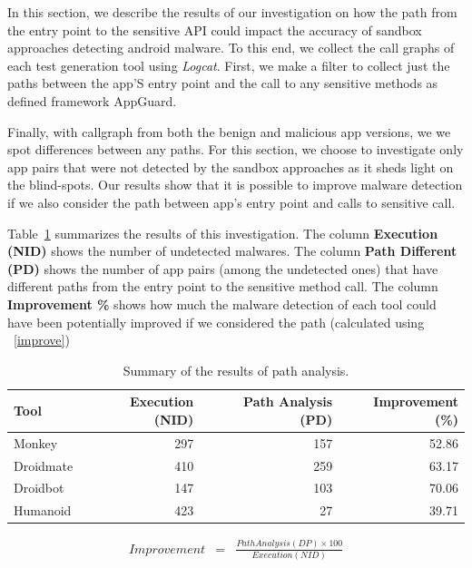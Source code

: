In this section, we describe the results of our investigation on how the path from the entry point to the sensitive API could impact the accuracy of sandbox approaches detecting android malware. To this end, we collect the call graphs of each test generation tool using \emph{Logcat}. First, we make a filter to collect just the paths between the app'S entry point and the call to any sensitive methods as defined framework AppGuard.

Finally, with callgraph from both the benign and malicious app versions, we we spot differences between any paths. For this section, we choose to investigate only app pairs that were not detected by  the sandbox approaches as it sheds light on the blind-spots. Our results show that it is possible to improve malware detection if we also consider the path between app's entry point and calls to sensitive call.

Table~\ref{tab:pa} summarizes the results of this investigation. The column \textbf{Execution (NID)} shows the number of undetected malwares. The column  \textbf{Path Different (PD)} shows the number of app pairs (among the undetected ones) that have different paths from the entry point to the sensitive method call. The column \textbf{Improvement \%} shows how much the malware detection of each tool could have been potentially improved if we considered the path (calculated using ~\eqref{improve})


\begin{table}[ht]
  \caption{Summary of the results of path analysis. }
  \centering
  \begin{small}
 \begin{tabular}{lrrr}
   \toprule
   Tool & Execution (NID) & Path Analysis (PD) & Improvement (\%) \\   \midrule
   Monkey &  297 & 157 & 52.86 \\ 
   Droidmate &  410 & 259 & 63.17 \\ 
   Droidbot &  147 & 103 & 70.06 \\ 
   Humanoid &  423 & 27 & 39.71 \\ 
 \bottomrule
 \end{tabular}
 \end{small}
 \label{tab:pa}
\end{table}

\begin{eqnarray}
Improvement & = & \frac{Path Analysis (DP) \times 100}{Execution (NID)} 
\label{improve}
\end{eqnarray}

